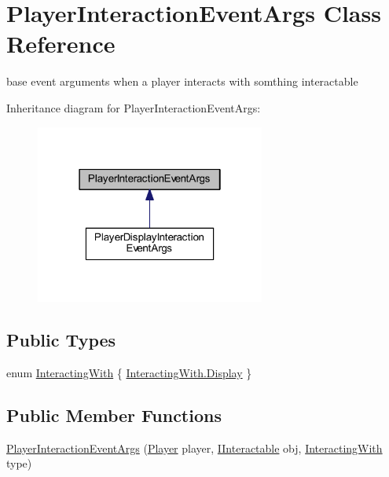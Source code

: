 \hypertarget{class_player_interaction_event_args}{}\section{Player\+Interaction\+Event\+Args Class Reference}
\label{class_player_interaction_event_args}


base event arguments when a player interacts with somthing interactable  




Inheritance diagram for Player\+Interaction\+Event\+Args\+:
\nopagebreak
\begin{figure}[H]
\begin{center}
\leavevmode
\includegraphics[width=214pt]{class_player_interaction_event_args__inherit__graph}
\end{center}
\end{figure}
\subsection*{Public Types}
\begin{DoxyCompactItemize}
\item 
enum \mbox{\hyperlink{class_player_interaction_event_args_a5ee5b290c0a1c78cd0496cad571933d2}{Interacting\+With}} \{ \mbox{\hyperlink{class_player_interaction_event_args_a5ee5b290c0a1c78cd0496cad571933d2ab9987a246a537f4fe86f1f2e3d10dbdb}{Interacting\+With.\+Display}}
 \}
\end{DoxyCompactItemize}
\subsection*{Public Member Functions}
\begin{DoxyCompactItemize}
\item 
\mbox{\hyperlink{class_player_interaction_event_args_ab67ebc6a7a2d9d4a618a59154d21ea99}{Player\+Interaction\+Event\+Args}} (\mbox{\hyperlink{class_player}{Player}} player, \mbox{\hyperlink{interface_i_interactable}{I\+Interactable}} obj, \mbox{\hyperlink{class_player_interaction_event_args_a5ee5b290c0a1c78cd0496cad571933d2}{Interacting\+With}} type)
\end{DoxyCompactItemize}
